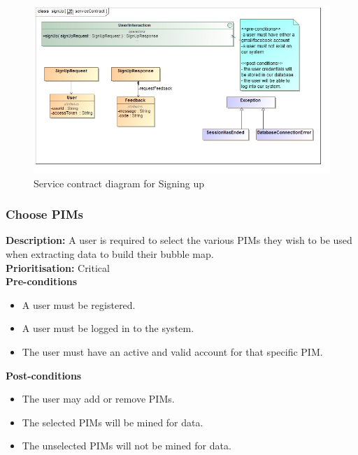 \documentclass[hidelinks,english]{article}
\begin{document}
    			\begin{figure}[!h]
    			\includegraphics[width=\linewidth]{serviceContractSignUp.jpg}
    			\caption{Service contract diagram for Signing up}
    			\label{ServiceContractSignUp}
    			\end{figure}
    			
    		\subsubsection{Choose PIMs}
				\textbf{Description:}  A user is required to select the various PIMs they wish to be used when extracting data to build their bubble map.\\
    			\textbf{Prioritisation:} Critical\\
      			\textbf{Pre-conditions}
    			\begin{itemize}
        			\item A user must be registered.
        			\item A user must be logged in to the system.
        			\item The user must have an active and valid account for that specific PIM.
    			\end{itemize}
    			\textbf{Post-conditions}
     			\begin{itemize}
        			\item The user may add or remove PIMs.
        			\item The selected PIMs will be mined for data.
        			\item The unselected PIMs will not be mined for data.
    			\end{itemize}
\end{document}
